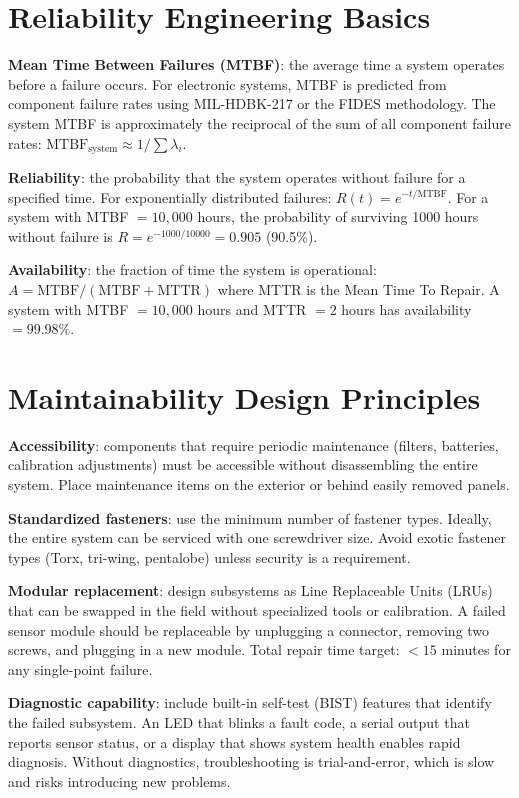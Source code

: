\section{Reliability Engineering Basics}
\textbf{Mean Time Between Failures (MTBF)}: the average time a system operates before a failure occurs. For electronic systems, MTBF is predicted from component failure rates using MIL-HDBK-217 or the FIDES methodology. The system MTBF is approximately the reciprocal of the sum of all component failure rates: $\text{MTBF}_{\text{system}} \approx 1/\sum \lambda_i$.

\textbf{Reliability}: the probability that the system operates without failure for a specified time. For exponentially distributed failures: $R(t) = e^{-t/\text{MTBF}}$. For a system with MTBF $= 10{,}000$ hours, the probability of surviving 1000 hours without failure is $R = e^{-1000/10000} = 0.905$ (90.5\%).

\textbf{Availability}: the fraction of time the system is operational: $A = \text{MTBF}/(\text{MTBF} + \text{MTTR})$ where MTTR is the Mean Time To Repair. A system with MTBF $= 10{,}000$ hours and MTTR $= 2$ hours has availability $= 99.98\%$.

\section{Maintainability Design Principles}
\textbf{Accessibility}: components that require periodic maintenance (filters, batteries, calibration adjustments) must be accessible without disassembling the entire system. Place maintenance items on the exterior or behind easily removed panels.

\textbf{Standardized fasteners}: use the minimum number of fastener types. Ideally, the entire system can be serviced with one screwdriver size. Avoid exotic fastener types (Torx, tri-wing, pentalobe) unless security is a requirement.

\textbf{Modular replacement}: design subsystems as Line Replaceable Units (LRUs) that can be swapped in the field without specialized tools or calibration. A failed sensor module should be replaceable by unplugging a connector, removing two screws, and plugging in a new module. Total repair time target: $< 15$ minutes for any single-point failure.

\textbf{Diagnostic capability}: include built-in self-test (BIST) features that identify the failed subsystem. An LED that blinks a fault code, a serial output that reports sensor status, or a display that shows system health enables rapid diagnosis. Without diagnostics, troubleshooting is trial-and-error, which is slow and risks introducing new problems.

